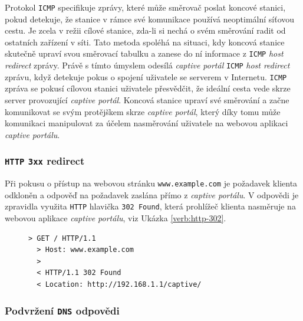 \documentclass[thesis=M,czech]{FITthesis}[2012/10/20]
\renewcommand{\lstlistingname}{Ukázka kódu}
\begin{document}
Protokol \texttt{ICMP} specifikuje zprávy, které může směrovač poslat koncové stanici, pokud detekuje, že stanice v rámce své komunikace používá neoptimální síťovou cestu. Je zcela v režii cílové stanice, zda-li si nechá o svém směrování radit od ostatních zařízení v síti. Tato metoda spoléhá na situaci, kdy koncová stanice skutečně upraví svou směrovací tabulku a zanese do ní informace z \texttt{ICMP} \textit{host redirect} zprávy. Právě s tímto úmyslem odesílá \textit{captive portál} \texttt{ICMP} \textit{host redirect} zprávu, když detekuje pokus o spojení uživatele se serverem v Internetu. \texttt{ICMP} zpráva se pokusí cílovou stanici uživatele přesvědčit, že ideální cesta vede skrze server provozující \textit{captive portál}. Koncová stanice upraví své směrování a začne komunikovat se svým protějškem skrze \textit{captive portál}, který díky tomu může komunikaci manipulovat za účelem nasměrování uživatele na webovou aplikaci \textit{captive portálu}.




\subsubsection{\texttt{HTTP} \texttt{3xx} redirect}
Při pokusu o přístup na webovou stránku \texttt{www.example.com} je požadavek klienta odkloněn a odpověď na požadavek zaslána přímo z \textit{captive portálu}. V odpovědi je zpravidla využita \texttt{HTTP} hlavička \texttt{302 Found}, která prohlížeč klienta nasměruje na webovou aplikace \textit{captive portálu}, viz Ukázka \ref{verb:http-302}.

\begin{figure}[h]
  \renewcommand{\lstlistingname}{Ukázka}
  \begin{lstlisting}[label=verb:http-302, caption={Ukázka přesměrování HTTP požadavku (zkráceno)},frame=single]
  > GET / HTTP/1.1
  > Host: www.example.com
  >
  < HTTP/1.1 302 Found
  < Location: http://192.168.1.1/captive/
  \end{lstlisting}
\end{figure}


\subsubsection{Podvržení \texttt{DNS} odpovědi}
\end{document}
